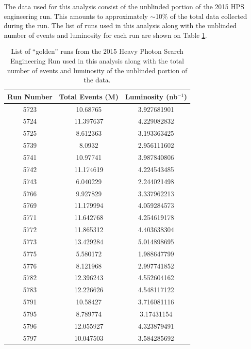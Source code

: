 The data used for this analysis consist of the unblinded portion of the 2015 
HPS engineering run.  This amounts to approximately $\sim$10\% of the total 
data collected during the run.  The list of runs used in this analysis along
with the unblinded number of events and luminosity for each run 
are shown on Table \ref{tab:data}.
\begin{table}[t]
    \centering
    \begin{tabular}{ccc}
        \toprule
        \textbf{Run Number} & \textbf{Total Events (M)} & \textbf{Luminosity (nb$^{-1}$)} \\
        \midrule
        \midrule
        5723 & 10.68765  & 3.927681901  \\
        5724 & 11.397637 & 4.229082832    \\
        5725 & 8.612363  & 3.193363425   \\
        5739 & 8.0932    & 2.956111602   \\
        5741 & 10.97741  & 3.987840806   \\
        5742 & 11.174619 & 4.224543485   \\
        5743 & 6.040229  & 2.244021498 \\
        5766 & 9.927829  & 3.337962213 \\
        5769 & 11.179994 & 4.059284573 \\
        5771 & 11.642768 & 4.254619178 \\
        5772 & 11.865312 & 4.403638304 \\
        5773 & 13.429284 & 5.014898695 \\
        5775 & 5.580172  & 1.988647799 \\
        5776 & 8.121968  & 2.997741852 \\
        5782 & 12.396243 & 4.552604162 \\
        5783 & 12.226626 & 4.548117122 \\
        5791 & 10.58427  & 3.716081116 \\
        5795 & 8.789774  & 3.17431154 \\
        5796 & 12.055927 & 4.323879491 \\
        5797 & 10.047503 & 3.584285692 \\ 
        \bottomrule
    \end{tabular}
    \caption{List of ``golden'' runs from the 2015 Heavy Photon Search Engineering Run used
             in this analysis along with the total number of events
             and luminosity of the unblinded portion of the data.}
    \label{tab:data}
\end{table}

